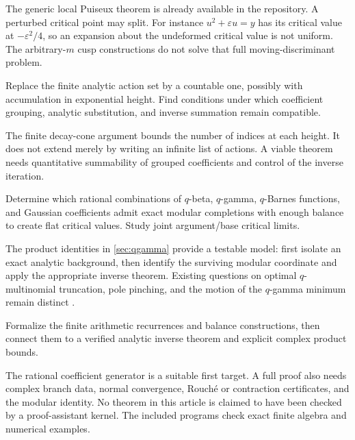 The generic local Puiseux theorem is already available in the
repository.  A perturbed critical point may split.
For instance \(u^2+\varepsilon u=y\) has its critical value at
\(-\varepsilon^2/4\), so an expansion about the undeformed
critical value is not uniform.
The arbitrary-\(m\) cusp constructions do not solve that
full moving-discriminant problem.

\begin{question}
Replace the finite analytic action set by a countable one,
possibly with accumulation in exponential height.
Find conditions under which coefficient grouping, analytic
substitution, and inverse summation remain compatible.
\end{question}

The finite decay-cone argument bounds the number of indices at
each height.  It does not extend merely by writing an infinite
list of actions.  A viable theorem needs quantitative summability
of grouped coefficients and control of the inverse iteration.

\begin{question}
Determine which rational combinations of \(q\)-beta,
\(q\)-gamma, \(q\)-Barnes functions, and Gaussian coefficients
admit exact modular completions with enough balance to create
flat critical values.  Study joint argument/base critical limits.
\end{question}

The product identities in \cref{sec:qgamma} provide a
testable model: first isolate an exact analytic background, then
identify the surviving modular coordinate and apply the
appropriate inverse theorem.
Existing questions on optimal \(q\)-multinomial truncation,
pole pinching, and the motion of the \(q\)-gamma minimum remain
distinct \cite{repo-qsharp,repo-qmono}.

\begin{question}
Formalize the finite arithmetic recurrences and balance
constructions, then connect them to a verified analytic
inverse theorem and explicit complex product bounds.
\end{question}

The rational coefficient generator is a suitable first target.
A full proof also needs complex branch data, normal convergence,
Rouch\'e or contraction certificates, and the modular identity.
No theorem in this article is claimed to have been checked by
a proof-assistant kernel.  The included programs check exact
finite algebra and numerical examples.

